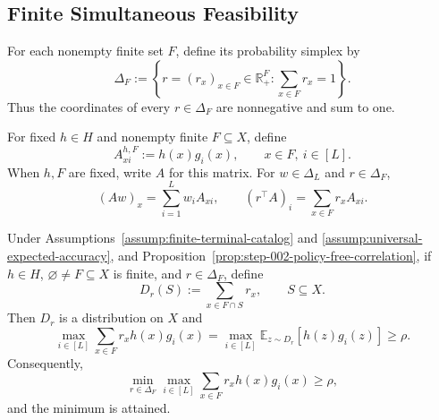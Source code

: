 \subsection{Finite Simultaneous Feasibility}
\label{app:finite-simultaneous-feasibility}

For each nonempty finite set $F$, define its probability simplex by
\[
\Delta_F:=\left\{r=(r_x)_{x\in F}\in\mathbb R_+^F:
\sum_{x\in F}r_x=1\right\}.
\]
Thus the coordinates of every $r\in\Delta_F$ are nonnegative and sum to one.

For fixed $h\in H$ and nonempty finite $F\subseteq X$, define
\begin{equation}\label{eq:finite-payoff-matrix}
A^{h,F}_{xi}:=h(x)g_i(x),\qquad x\in F,\ i\in[L].
\end{equation}
When $h,F$ are fixed, write $A$ for this matrix.  For
$w\in\Delta_L$ and $r\in\Delta_F$,
\[
(Aw)_x=\sum_{i=1}^Lw_iA_{xi},\qquad
(r^\top A)_i=\sum_{x\in F}r_xA_{xi}.
\]

\begin{lemma}
\label{lem:step-003-finite-support-payoff}
Under Assumptions~\ref{assump:finite-terminal-catalog} and
\ref{assump:universal-expected-accuracy}, and
Proposition~\ref{prop:step-002-policy-free-correlation}, if $h\in H$,
$\varnothing\ne F\subseteq X$ is finite, and $r\in\Delta_F$, define
\begin{equation}\label{eq:finite-support-law}
D_r(S):=\sum_{x\in F\cap S}r_x,\qquad S\subseteq X.
\end{equation}
Then $D_r$ is a distribution on $X$ and
\begin{equation}\label{eq:finite-support-payoff}
\max_{i\in[L]}\sum_{x\in F}r_xh(x)g_i(x)
=\max_{i\in[L]}\mathbb E_{z\sim D_r}[h(z)g_i(z)]
\ge\rho.
\end{equation}
Consequently,
\begin{equation}\label{eq:finite-row-value}
\min_{r\in\Delta_F}\max_{i\in[L]}
\sum_{x\in F}r_xh(x)g_i(x)\ge\rho,
\end{equation}
and the minimum is attained.
\end{lemma}

